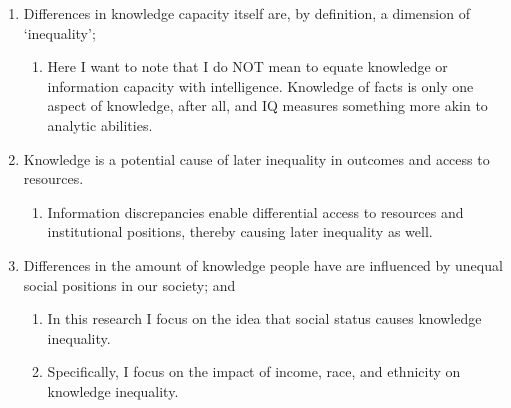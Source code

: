 \documentclass[]{article}
\begin{document}
\begin{enumerate}
  \item{Differences in knowledge capacity itself are, by definition, a dimension of `inequality';}
    \begin{enumerate}
      \item{Here I want to note that I do NOT mean to equate knowledge or information capacity with intelligence. Knowledge of facts is only one aspect of knowledge, after all, and IQ measures something more akin to analytic abilities.}
    \end{enumerate}

  \item{Knowledge is a potential cause of later inequality in outcomes and access to resources.}
    \begin{enumerate}
      \item{Information discrepancies enable differential access to resources and institutional positions, thereby causing later inequality as well.}
    \end{enumerate}

  \item{Differences in the amount of knowledge people have are influenced by unequal social positions in our society; and}
    \begin{enumerate}
      \item{In this research I focus on the idea that social status causes knowledge inequality.}
      \item{Specifically, I focus on the impact of income, race, and ethnicity on knowledge inequality.}
    \end{enumerate}
\end{enumerate}

\end{document}
